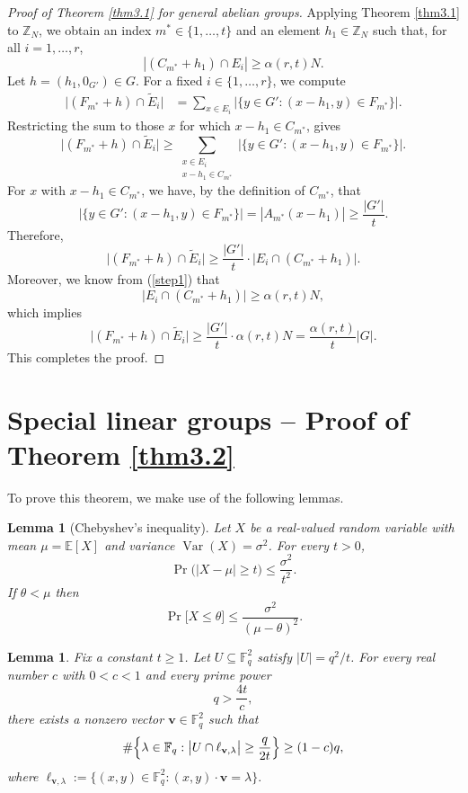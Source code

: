 \documentclass[11pt]{article}
\newtheorem{lemma}[theorem]{Lemma}
\theoremstyle{definition}
\begin{document}
\begin{proof}[Proof of Theorem \ref{thm3.1} for general abelian groups]
Applying Theorem \ref{thm3.1} to $\mathbb{Z}_N$, we obtain an index $m^\ast \in \{1,\dots,t\}$ and an element $h_1 \in \mathbb{Z}_{N}$ such that, for all $i = 1,\dots,r$,
\begin{equation}\label{step1}
|(C_{m^\ast} + h_1) \cap E_i| \geq \alpha(r,t) N.
\end{equation}
Let $h = (h_1, 0_{G'}) \in G$. For a fixed $i \in \{1,\dots,r\}$, we compute
\[
\begin{aligned}
\big|(F_{m^\ast} + h) \cap \widetilde{E}_i\big|
&= \sum_{x \in E_i} \big|\{y \in G' : (x - h_1, y) \in F_{m^\ast}\}\big|.
\end{aligned}
\]
Restricting the sum to those $x$ for which $x - h_1 \in C_{m^\ast}$, gives
\[\big|(F_{m^\ast} + h) \cap \widetilde{E}_i\big|
\geq \sum_{\substack{x \in E_i \\ x - h_1 \in C_{m^\ast}}} \big|\{y \in G' : (x - h_1, y) \in F_{m^\ast}\}\big|.
\]
For $x$ with $x - h_1 \in C_{m^\ast}$, we have, by the definition of $C_{m^\ast}$, that
\[
\big|\{y \in G' : (x - h_1, y) \in F_{m^\ast}\}\big| = |A_{m^\ast}(x - h_1)| \geq \frac{|G'|}{t}.
\]
Therefore,
\[
\big|(F_{m^\ast} + h) \cap \widetilde{E}_i\big| \geq \frac{|G'|}{t} \cdot \big|E_i \cap (C_{m^\ast} + h_1)\big|.
\]
Moreover, we know from (\ref{step1}) that
\[
\big|E_i \cap (C_{m^\ast} + h_1)\big| \geq \alpha(r,t) N,
\]
which implies
\[
\big|(F_{m^\ast} + h) \cap \widetilde{E}_i\big| \geq \frac{|G'|}{t} \cdot \alpha(r,t) N = \frac{\alpha(r,t)}{t} |G|.
\]This completes the proof.
\end{proof}


\section{Special linear groups -- Proof of Theorem \ref{thm3.2}}
To prove this theorem, we make use of the following lemmas. 

\begin{lemma}[Chebyshev's inequality]\label{lm3.22}
Let $X$ be a real-valued random variable with mean
$\mu=\mathbb{E}[X]$ and variance
$\operatorname{Var}(X)=\sigma^{2}$.
For every $t>0$,
\[
\Pr\!\bigl(|X-\mu|\ge t\bigr)\le\frac{\sigma^{2}}{t^{2}}.
\]
If $\theta<\mu$ then
\[
\Pr\bigl[X\le\theta\bigr]
      \le
      \frac{\sigma^{2}}{(\mu-\theta)^{2}}.
\]
\end{lemma}

\begin{lemma}\label{lm5.22}
Fix a constant $t\ge 1$.
Let $U\subseteq\mathbb{F}_{q}^{2}$ satisfy
$|U|=q^{2}/t$.
For every real number $c$ with $0<c<1$ and every prime power
\[
q>\frac{4t}{c},
\]
there exists a nonzero vector $\mathbf{v}\in\mathbb{F}_{q}^{2}$ such that
\[
\#\Bigl\{\lambda\in\mathbb{F}_{q}:
        \bigl|U\cap\ell_{\mathbf{v},\lambda}\bigr|
          \ge\frac{q}{2t}\Bigr\}
     \ge(1-c)q,
\]
where
$
\ell_{\mathbf{v},\lambda}:=\{(x,y)\in\mathbb{F}_{q}^{2}:(x,y)\cdot \mathbf{v}=\lambda\}.
$
\end{lemma}
\end{document}
